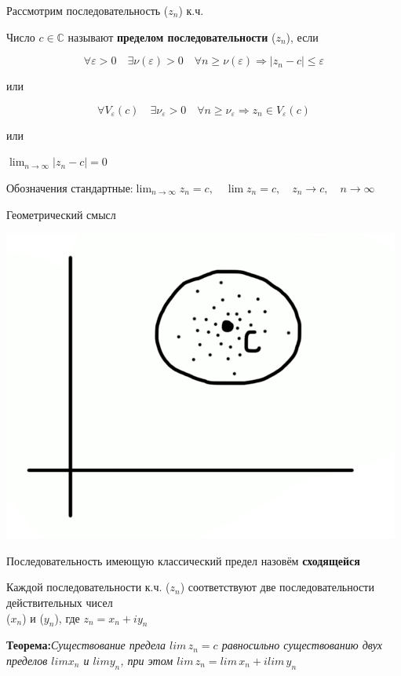 \documentclass[a4paper, 12pt]{report}
\begin{document}
 
 Рассмотрим последовательность ($z_n$) к.ч.
 \par\bigskip
 Число $c\in\mathbb{C}$ называют \textbf{пределом последовательности} ($z_n$), если 
 
 $$\forall\varepsilon>0 \quad \exists\nu(\varepsilon)>0 \quad\forall n\geqslant\nu(\varepsilon) \Rightarrow |z_n-c|\leqslant\varepsilon$$
 
 или 
 
 $$\forall V_\varepsilon(c) \quad \exists\nu_\varepsilon>0 \quad \forall n\geqslant\nu_\varepsilon \Rightarrow z_n\in V_\varepsilon(c)$$
 
 или
 
 \begin{center}
     $\lim_{n\to \infty} |z_n - c|=0$\ 
 \end{center}

Обозначения стандартные:\quad $\lim_{n\to \infty} z_n=c,\quad \lim z_n=c,\quad z_n\rightarrow c,\quad n\rightarrow\infty$
\par\bigskip
Геометрический смысл
\par
\includegraphics[width=0.3\linewidth]{kompl/2kompl.png}
  
\par\bigskip
Последовательность имеющую классический предел назовём \textbf{сходящейся}
\par\bigskip
Каждой последовательности к.ч. ($z_n$) соответствуют две последовательности действительных чисел \\($x_n$) и ($y_n$), где $z_n=x_n+iy_n$

\par\bigskip
\textbf{Теорема:}\quad \textit{Существование предела $lim\, z_n=c$ равносильно существованию двух пределов $lim x_n$ и $lim y_n$, при этом $lim\, z_n=lim\, x_n+ilim\, y_n$}
\bigskip
\end{document}
